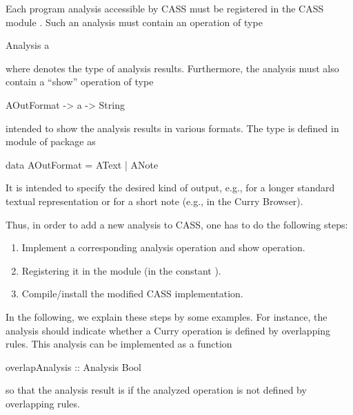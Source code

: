 Each program analysis accessible by CASS must be registered
in the CASS module .
Such an analysis must contain an operation of type
\begin{curry}
Analysis a
\end{curry}
where  denotes the type of analysis results.
Furthermore, the analysis must also contain a ``show'' operation of type
\begin{curry}
AOutFormat -> a -> String
\end{curry}
intended to show the analysis results in various formats.
The type  is defined in module
 of package  as
\begin{curry}
data AOutFormat = AText | ANote
\end{curry}
It is intended to specify the desired kind of output,
e.g.,  for a longer standard
textual representation or  for a short note
(e.g., in the Curry Browser).

Thus, in order to add a new analysis to CASS, one has to do the following
steps:
\begin{enumerate}
\item
Implement a corresponding analysis operation and show operation.
\item
Registering it in the module 
(in the constant ).
\item
Compile/install the modified CASS implementation.
\end{enumerate}
In the following, we explain these steps by some examples.
%
For instance, the  analysis should indicate
whether a Curry operation is defined by overlapping rules.
This analysis can be implemented as a function
\begin{curry}
overlapAnalysis :: Analysis Bool
\end{curry}
so that the analysis result is  if the analyzed
operation is not defined by overlapping rules.

